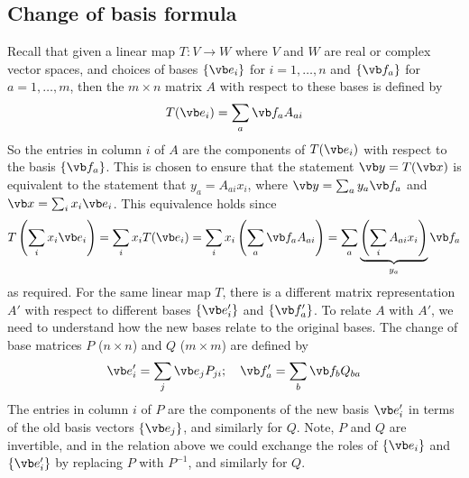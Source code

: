 \subsection{Change of basis formula}
Recall that given a linear map \(T\colon V \to W\) where \(V\) and \(W\) are real or complex vector spaces, and choices of bases \(\{ \vb e_i \}\) for \(i = 1, \dots, n\) and \(\{\vb f_a \}\) for \(a = 1, \dots, m\), then the \(m \times n\) matrix \(A\) with respect to these bases is defined by
\[
	T(\vb e_i) = \sum_a \vb f_a A_{ai}
\]
So the entries in column \(i\) of \(A\) are the components of \(T(\vb e_i)\) with respect to the basis \(\{ \vb f_a \}\).
This is chosen to ensure that the statement \(\vb y = T(\vb x)\) is equivalent to the statement that \(y_a = A_{ai}x_i\), where \(\vb y = \sum_a y_a \vb f_a\) and \(\vb x = \sum_i x_i \vb e_i\).
This equivalence holds since
\[
	T\left(\sum_i x_i \vb e_i \right) = \sum_i x_i T(\vb e_i) = \sum_i x_i \left( \sum_a \vb f_a A_{ai} \right) = \sum_a \underbrace{\left( \sum_i A_{ai} x_i \right)}_{y_a} \vb f_a
\]
as required.
For the same linear map \(T\), there is a different matrix representation \(A'\) with respect to different bases \(\{ \vb e'_i \}\) and \(\{ \vb f'_a \}\).
To relate \(A\) with \(A'\), we need to understand how the new bases relate to the original bases.
The change of base matrices \(P\) (\(n \times n\)) and \(Q\) (\(m \times m\)) are defined by
\[
	\vb e_i' = \sum_j \vb e_j P_{ji};\quad \vb f_a' = \sum_b \vb f_b Q_{ba}
\]
The entries in column \(i\) of \(P\) are the components of the new basis \(\vb e_i'\) in terms of the old basis vectors \(\{ \vb e_j \}\), and similarly for \(Q\).
Note, \(P\) and \(Q\) are invertible, and in the relation above we could exchange the roles of \(\{ \vb e_i \}\) and \(\{ \vb e'_i \}\) by replacing \(P\) with \(P^{-1}\), and similarly for \(Q\).

